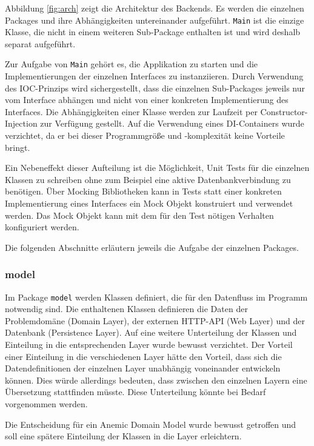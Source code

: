 \documentclass[
ngerman          %
,a4paper          %
,11pt
,pdftex
]{report}
\begin{document}
Abbildung \ref{fig:arch} zeigt die Architektur des Backends. Es werden die einzelnen Packages und ihre Abhängigkeiten untereinander aufgeführt. \texttt{Main} ist die einzige Klasse, die nicht in einem weiteren Sub-Package enthalten ist und wird deshalb separat aufgeführt.

Zur Aufgabe von \texttt{Main} gehört es, die Applikation zu starten und die Implementierungen der einzelnen Interfaces zu instanziieren. Durch Verwendung des \ac{IOC}-Prinzips wird sichergestellt, dass die einzelnen Sub-Packages jeweils nur vom Interface abhängen und nicht von einer konkreten Implementierung des Interfaces. Die Abhängigkeiten einer Klasse werden zur Laufzeit per Constructor-Injection zur Verfügung gestellt. Auf die Verwendung eines \ac{DI}-Containers wurde verzichtet, da er bei dieser Programmgröße und -komplexität keine Vorteile bringt.

Ein Nebeneffekt dieser Aufteilung ist die Möglichkeit, Unit Tests für die einzelnen Klassen zu schreiben ohne zum Beispiel eine aktive Datenbankverbindung zu benötigen. Über Mocking Bibliotheken kann in Tests statt einer konkreten Implementierung eines Interfaces ein Mock Objekt konstruiert und verwendet werden. Das Mock Objekt kann mit dem für den Test nötigen Verhalten konfiguriert werden.

Die folgenden Abschnitte erläutern jeweils die Aufgabe der einzelnen Packages.

\subsubsection{model}
\label{sec:model}

Im Package \texttt{model} werden Klassen definiert, die für den Datenfluss im Programm notwendig sind. Die enthaltenen Klassen definieren die Daten der Problemdomäne (Domain Layer), der externen \ac{HTTP}-\ac{API} (Web Layer) und der Datenbank (Persistence Layer). Auf eine weitere Unterteilung der Klassen und Einteilung in die entsprechenden Layer wurde bewusst verzichtet. Der Vorteil einer Einteilung in die verschiedenen Layer hätte den Vorteil, dass sich die Datendefinitionen der einzelnen Layer unabhängig voneinander entwickeln können. Dies würde allerdings bedeuten, dass zwischen den einzelnen Layern eine Übersetzung stattfinden müsste. Diese Unterteilung könnte bei Bedarf vorgenommen werden.

Die Entscheidung für ein Anemic Domain Model wurde bewusst getroffen und soll eine spätere Einteilung der Klassen in die Layer erleichtern.
\end{document}
